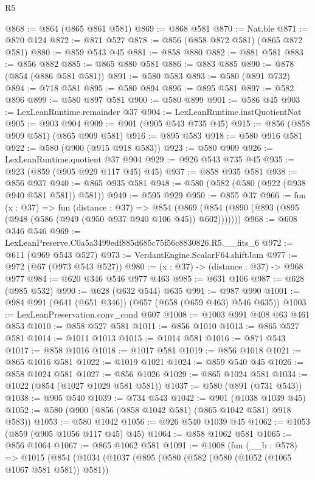 \begin{lexlean}{R5}
\begin{coremodule}
@868 := @864 (@865 @861 @581)
@869 := @868 @581
@870 := Nat.ble
@871 := @870 @124
@872 := @871 @527
@878 := @856 (@858 @872 @581) (@865 @872 @581)
@880 := @859 @543 @45
@881 := @858 @880
@882 := @881 @581
@883 := @856 @882
@885 := @865 @880 @581
@886 := @883 @885
@890 := @878 (@854 (@886 @581 @581))
@891 := @580 @583
@893 := @580 (@891 @732)
@894 := @718 @581
@895 := @580 @894
@896 := @895 @581
@897 := @582 @896
@899 := @580 @897 @581
@900 := @580 @899
@901 := @586 @45
@903 := LexLeanRuntime.remainder @37
@904 := LexLeanRuntime.instQuotientNat
@905 := @903 @904
@909 := @901 (@905 @543 @735 @45)
@915 := @856 (@858 @909 @581) (@865 @909 @581)
@916 := @895 @583
@918 := @580 @916 @581
@922 := @580 (@900 (@915 @918 @583))
@923 := @580 @909
@926 := LexLeanRuntime.quotient @37 @904
@929 := @926 @543 @735 @45
@935 := @923 (@859 (@905 @929 @117 @45) @45)
@937 := @858 @935 @581
@938 := @856 @937
@940 := @865 @935 @581
@948 := @580 (@582 (@580 (@922 (@938 @940 @581 @581)) @581))
@949 := @595 @929
@950 := @855 @37
@966 := fun (x : @37) =>
  fun (distance : @37) =>
  @854 (@869 (@854 (@890 (@893 (@895 (@948 (@586 (@949 (@950 @937 @940 @106 @45)) @602)))))))
@968 := @608 @346 @546
@969 := LexLeanPreserve.C0a5a3499edf885d685c75f56c8830826.R5.__fits_6
@972 := @611 (@969 @543 @527)
@973 := VerdantEngine.ScalarF64.shiftJam
@977 := @972 (@67 (@973 @543 @527))
@980 := (x : @37) -> (distance : @37) -> @968 @977
@984 := @620 @346 @546 @977 @463
@985 := @631 @106
@987 := @628 (@985 @532)
@990 := @628 (@632 @544) @635
@991 := @987 @990
@1001 := @984 @991 (@641 (@651 @346)) (@657 (@658 (@659 @463) @546 @635))
@1003 := LexLeanPreservation.conv_cond @607
@1008 := @1003 @991 @408 @63 @461 @853
@1010 := @858 @527 @581
@1011 := @856 @1010
@1013 := @865 @527 @581
@1014 := @1011 @1013
@1015 := @1014 @581
@1016 := @871 @543
@1017 := @858 @1016
@1018 := @1017 @581
@1019 := @856 @1018
@1021 := @865 @1016 @581
@1022 := @1019 @1021
@1024 := @859 @540 @45
@1026 := @858 @1024 @581
@1027 := @856 @1026
@1029 := @865 @1024 @581
@1034 := @1022 (@854 (@1027 @1029 @581 @581))
@1037 := @580 (@891 (@731 @543))
@1038 := @905 @540
@1039 := @734 @543
@1042 := @901 (@1038 @1039 @45)
@1052 := @580 (@900 (@856 (@858 @1042 @581) (@865 @1042 @581) @918 @583))
@1053 := @580 @1042
@1056 := @926 @540 @1039 @45
@1062 := @1053 (@859 (@905 @1056 @117 @45) @45)
@1064 := @858 @1062 @581
@1065 := @856 @1064
@1067 := @865 @1062 @581
@1091 := @1008
    (fun (__b : @578) =>
    @1015
      (@854
        (@1034
          (@1037
            (@895
              (@580
                (@582 (@580 (@1052 (@1065 @1067 @581 @581)) @581))

\end{coremodule}
\end{lexlean}
